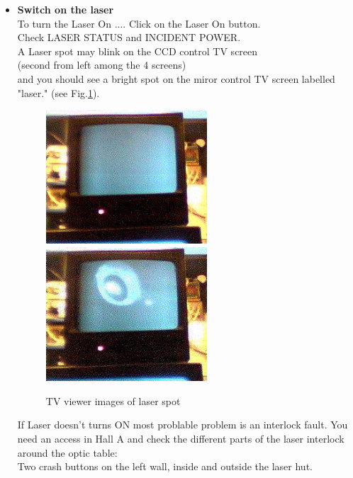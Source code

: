 \begin{itemize}
\item {\bf Switch on the laser}\\

To turn the Laser On .... Click on the Laser On button.\\
        Check LASER STATUS and INCIDENT POWER.\\
        A Laser spot may blink on the CCD control TV screen\\ 
	(second from left among the 4 screens)\\
        and you should see a bright spot on the miror control TV screen labelled "laser." 
	(see Fig.\ref{fig:compton_laser_photo}).
 \begin{figure}[htp]
    \begin{center}
        \includegraphics*[angle=0,width=6cm]{compton_laseroff_photo}
        \includegraphics*[angle=0,width=6cm]{compton_laseron_photo}
    \end{center}
    \caption[compton:laser spot]{TV viewer images of laser spot }
    \label{fig:compton_laser_photo}
 \end{figure}

        If Laser doesn't turns ON most problable problem is an interlock
        fault.
        You need an access in Hall A and check the different parts of the
        laser interlock around the optic table:\\
        Two crash buttons on the left wall, inside and outside the laser hut.
        \\
	

\end{itemize}
